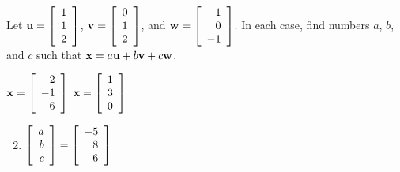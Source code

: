 \begin{multicols}{2}
\begin{ex}
\begin{sol}
\begin{enumerate}[label={\alph*.}]
\end{enumerate}
\end{sol}
\end{ex}

\begin{ex}
Let 
$\textbf{u} = \left[
\begin{array}{r}
1\\
1\\
2
\end{array}
\right]$,
$\textbf{v} = \left[
\begin{array}{r}
0\\
1\\
2
\end{array}
\right]$, and \newline
$\textbf{w} = \left[
\begin{array}{r}
1\\
0\\
-1
\end{array}
\right]$. In each case, find numbers $a$, $b$, and $c$ such that $\textbf{x} = a\textbf{u} + b\textbf{v} + c\textbf{w}$.

\begin{exenumerate}
\exitem $\textbf{x} = \left[
\begin{array}{r}
2\\
-1\\
6
\end{array}
\right]$
\exitem $\textbf{x} = \left[
\begin{array}{r}
1\\
3\\
0
\end{array}
\right]$
\end{exenumerate}

\begin{sol}
\begin{enumerate}[label={\alph*.}]
\setcounter{enumi}{1}
\item 
$\left[
\begin{array}{r}
a\\
b\\
c
\end{array}
\right]
=
\left[
\begin{array}{r}
-5\\
8\\
6
\end{array}
\right]$
\end{enumerate}
\end{sol}
\end{ex}


\end{multicols}
